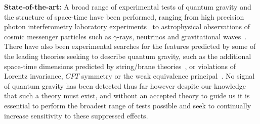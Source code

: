 \documentclass[a4paper,11pt]{article}
\begin{document}
\textbf{State-of-the-art:} A broad range of experimental tests of quantum gravity and the structure of space-time have been performed, ranging from high precision photon interferometry laboratory experiments~\cite{Chou:2015sle} to astrophysical observations of cosmic messenger particles such as $\gamma$-rays, neutrinos and gravitational waves~\cite{Lieu:2003ee, Abdo2009, HESS:2011aa, Perlman_2015, Vasileiou2015, PhysRevD.99.083009, Cooke:2020rco, Amelino-Camelia:2016fuh, ELLIS2019352, PhysRevD.102.063027, Wei:2018ajw, Calcagni:2020ume}. There have also been experimental searches for the features predicted by some of the leading theories seeking to describe quantum gravity, such as the additional space-time dimensions predicted by string/brane theories~\cite{Aad:2012ic, Carena:2017qhd, Sirunyan:2018ipj}, or violations of Lorentz invariance, $CPT$ symmetry or the weak equivalence principal~\cite{Bennett:2007aa, Aartsen:2017ibm, ELLIS2019352, PhysRevD.102.063027, Wei:2018ajw, Daniel:2015mua, Pruttivarasin:2014pja, Kostelecky:2015dpa, Abe:2014wla, Kostelecky:2013rv}. No signal of quantum gravity has been detected thus far however despite our knowledge that such a theory must exist, and without an accepted theory to guide us it is essential to perform the broadest range of tests possible and seek to continually increase sensitivity to these suppressed effects. \\








\end{document}
